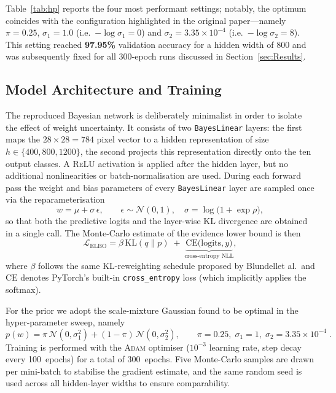 \documentclass{article}
\begin{document}
Table~\ref{tab:hp} reports the four most performant settings; notably, the optimum coincides with the configuration highlighted in the original paper—namely $\pi=0.25$, $\sigma_{1}=1.0$ (i.e.\ $-\!\log\sigma_1=0$) and $\sigma_{2}=3.35\times10^{-4}$ (i.e.\ $-\!\log\sigma_2=8$).  
This setting reached \textbf{97.95\%} validation accuracy for a hidden width of 800 and was subsequently fixed for all 300‑epoch runs discussed in Section~\ref{sec:Results}.

\subsection{Model Architecture and Training}

The reproduced Bayesian network is deliberately minimalist in order to isolate the effect of weight uncertainty.  It consists of two \texttt{BayesLinear} layers: the first maps the $28\times28=784$ pixel vector to a hidden representation of size $h\in\{400,800,1200\}$, the second projects this representation directly onto the ten output classes.  A \textsc{ReLU} activation is applied after the hidden layer, but no additional nonlinearities or batch-normalisation are used.  During each forward pass the weight and bias parameters of every \texttt{BayesLinear} layer are sampled once via the reparameterisation
\[
w = \mu + \sigma \,\epsilon,\qquad 
\epsilon\sim\mathcal{N}(0,1),\quad 
\sigma=\log\!\bigl(1+\exp\rho\bigr),
\]
so that both the predictive logits and the layer-wise KL divergence are obtained in a single call.  The Monte-Carlo estimate of the evidence lower bound is then
\[
\mathcal{L}_{\text{ELBO}} = \beta\,\text{KL}(q\|p)\;+\;
\underbrace{\text{CE}\bigl(\text{logits},y\bigr)}_{\text{cross-entropy NLL}},
\]
where $\beta$ follows the same KL-reweighting schedule proposed by Blundell\;et al.\ and $\text{CE}$ denotes PyTorch’s built-in \texttt{cross\_entropy} loss (which implicitly applies the softmax).

For the prior we adopt the scale-mixture Gaussian found to be optimal in the hyper-parameter sweep, namely
\[
p(w)=\pi\,\mathcal{N}(0,\sigma_1^2) + (1-\pi)\,\mathcal{N}(0,\sigma_2^2),
\qquad
\pi=0.25,\;\sigma_1=1,\;\sigma_2=3.35\times10^{-4}\;.
\]
Training is performed with the \textsc{Adam} optimiser ($10^{-3}$ learning rate, step decay every 100~epochs) for a total of 300~epochs.  Five Monte-Carlo samples are drawn per mini-batch to stabilise the gradient estimate, and the same random seed is used across all hidden-layer widths to ensure comparability.
\end{document}
